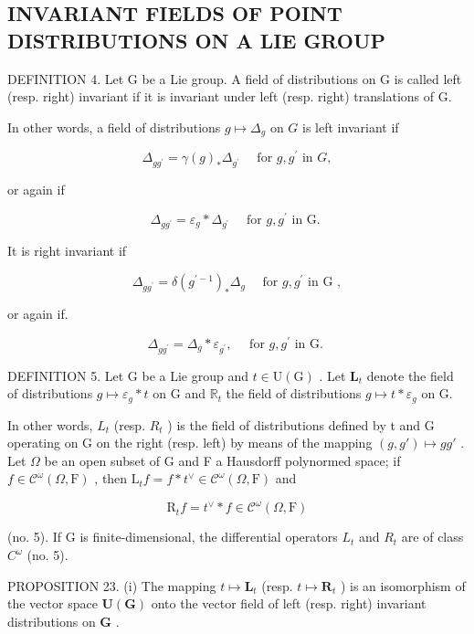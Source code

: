 \subsection{INVARIANT FIELDS OF POINT DISTRIBUTIONS ON A LIE GROUP}

DEFINITION 4. Let G be a Lie group. A field of distributions on G is called left (resp. right) invariant if it is invariant under left (resp. right) translations of G.

In other words, a field of distributions \(g \mapsto \Delta_g\) on \(G\) is left invariant if

\[
\Delta_ {g g ^ {\prime}} = \gamma (g) _ {*} \Delta_ {g ^ {\prime}} \quad \text { for } g, g ^ {\prime} \text { in } G,
\]

or again if

\[
\Delta_ {g g ^ {\prime}} = \varepsilon_ {g} * \Delta_ {g ^ {\prime}} \quad \text { for   } g, g ^ {\prime} \text {   in   G. }
\]

It is right invariant if

\[
\Delta_ {g g ^ {\prime}} = \delta (g ^ {\prime - 1}) _ {*} \Delta_ {g} \quad \text { for   } g, g ^ {\prime} \text {   in   G },
\]

or again if.

\[
\Delta_ {g g ^ {\prime}} = \Delta_ {g} * \varepsilon_ {g ^ {\prime}}, \quad \text { for   } g, g ^ {\prime} \text {   in   G. }
\]

DEFINITION 5. Let G be a Lie group and \(t \in \mathrm{U}(\mathrm{G})\) . Let \(\mathbf{L}_t\) denote the field of distributions \(g \mapsto \varepsilon_g * t\) on G and \(\mathbb{R}_t\) the field of distributions \(g \mapsto t * \varepsilon_g\) on G.

In other words, \(L_{t}\) (resp. \(R_{t}\) ) is the field of distributions defined by t and G operating on G on the right (resp. left) by means of the mapping \((g, g') \mapsto gg'\) . Let \(\Omega\) be an open subset of G and F a Hausdorff polynormed space; if \(f \in \mathcal{C}^{\omega}(\Omega, \mathrm{F})\) , then \(\mathrm{L}_{t}f = f * t^{\vee} \in \mathcal{C}^{\omega}(\Omega, \mathrm{F})\) and

\[
\mathrm{R} _ {t} f = t ^ {\vee} * f \in \mathcal {C} ^ {\omega} (\Omega , \mathrm{F})
\]

(no. 5). If G is finite-dimensional, the differential operators \(L_{t}\) and \(R_{t}\) are of class \(C^{\omega}\) (no. 5).

PROPOSITION 23. (i) The mapping \(t \mapsto \mathbf{L}_t\) (resp. \(t \mapsto \mathbf{R}_t\) ) is an isomorphism of the vector space \(\mathbf{U}(\mathbf{G})\) onto the vector field of left (resp. right) invariant distributions on \(\mathbf{G}\) .

